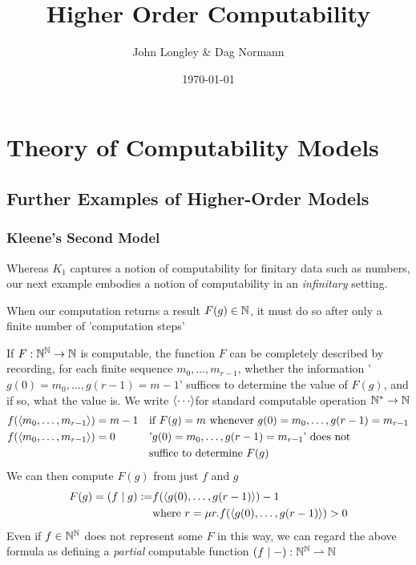 \documentclass[11pt]{article}
\author{John Longley \& Dag Normann}
\date{\today}
\title{Higher Order Computability}
\begin{document}
\maketitle
\tableofcontents


\section{Theory of Computability Models}
\label{sec:org772aa94}
\subsection{Further Examples of Higher-Order Models}
\label{sec:org1838659}
\subsubsection{Kleene's Second Model}
\label{sec:orgef1c5ca}
Whereas \(K_1\) captures a notion of computability for finitary data such as numbers, our next
example embodies a notion of computability in an \emph{infinitary} setting.

When our computation returns a result \(F(g)\in\mathbb{N}\), it must do so after only a finite number of
'computation steps'

If \(F:\mathbb{N}^{\mathbb{N}}\to\mathbb{N}\) is computable, the function \(F\) can be completely described by recording, for
each finite sequence \(m_0,\dots,m_{r-1}\), whether the information '\(g(0)=m_0,\dots,g(r-1)=m-1\)'
suffices to determine the value of \(F(g)\), and if so, what the value is. We write \(\la\cdots\ra\)for
standard computable operation \(\mathbb{N}^*\to\mathbb{N}\)
\begin{align*}
&f(\langle m_0,\dots,m_{r-1}\rangle)=m-1&&\text{if }F(g)=m\text{ whenever }g(0)=m_0,\dots,g(r-1)=m_{r-1}\\
&f(\langle m_0,\dots,m_{r-1}\rangle)=0&&\text{'}g(0)=m_0,\dots,g(r-1)=m_{r-1}\text{' does not}\\
&&&\text{suffice to determine }F(g)
\end{align*}
We can then compute \(F(g)\) from just \(f\) and \(g\)
\begin{align*}
F(g)=(f\mid g):=&f(\langle g(0),\dots,g(r-1)\rangle)-1\\
&\text{where }r=\mu r.f(\langle g(0),\dots,g(r-1)\rangle)>0
\end{align*}
Even if \(f\in\mathbb{N}^{\mathbb{N}}\) does not represent some \(F\) in this way, we can regard the above formula
as defining a \emph{partial} computable function \((f\mid-):\mathbb{N}^{\mathbb{N}}\rightharpoonup\mathbb{N}\)
\end{document}
